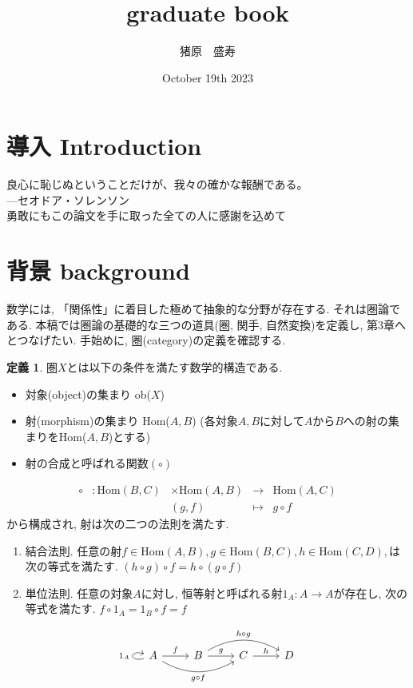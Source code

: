 \documentclass[a4paper]{jsarticle}
\title{graduate book}
\author{猪原　盛寿}
\date{October 19th 2023}
\theoremstyle{definition}
\newtheorem{dfn}{定義}[section]
\newcommand{\Hom}{{\mathrm{Hom}}}
\begin{document}
\Large
\maketitle

\section{導入 Introduction}
良心に恥じぬということだけが、我々の確かな報酬である。\\
---セオドア・ソレンソン\\
勇敢にもこの論文を手に取った全ての人に感謝を込めて
\section{背景 background}
数学には, 「関係性」に着目した極めて抽象的な分野が存在する. それは圏論である. 本稿では圏論の基礎的な三つの道具(圏, 関手, 自然変換)を定義し, 第3章へとつなげたい. 手始めに, 圏(category)の定義を確認する.
\begin{dfn}
圏$X$とは以下の条件を満たす数学的構造である. 
\begin{itemize}
    \item 対象(object)の集まり ob($X$)
    \item 射(morphism)の集まり Hom($A,B$)
    (各対象$A, B$に対して$A$から$B$への射の集まりをHom($A, B$)とする)
    \item 射の合成と呼ばれる関数$(\circ)$
\end{itemize}
\begin{equation}
    \begin{array}{lllll}
     \circ &: \Hom (B, C) &\times \Hom (A, B) &\rightarrow &\Hom (A, C)  \\
         &    & (g,f) & \mapsto&  g\circ f
\end{array}
\end{equation}
から構成され, 射は次の二つの法則を満たす.
\begin{enumerate}[(1)]
    \item 結合法則. 任意の射$f\in \Hom(A,B), g\in \Hom(B,C), h\in \Hom(C,D),$は次の等式を満たす. $(h \circ g) \circ f = h \circ (g \circ f)$  
    \item 単位法則. 任意の対象$A$に対し, 恒等射と呼ばれる射$1_A:A\rightarrow A$が存在し, 次の等式を満たす.  $f\circ 1_A = 1_B\circ f = f$  
\end{enumerate}
\begin{equation}
    \begin{tikzcd}
    A\ar{r}{f} \ar[loop left,"1_A"] \ar[bend right=30,swap]{rr}{g\circ f}& B\ar{r}{g} \ar[bend left=30]{rr}{h\circ g}& C\ar{r}{h} & D
\end{tikzcd}
\end{equation}
\end{dfn}
\end{document}
